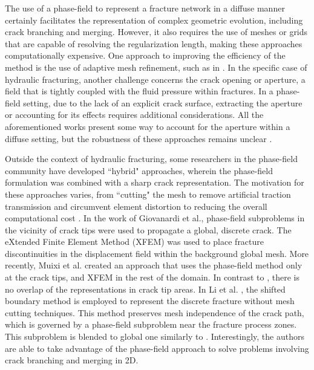     The use of a phase-field to represent a fracture network in a diffuse manner certainly facilitates the representation of complex geometric evolution, including crack branching and merging. However, it also requires the use of meshes or grids that are capable of resolving the regularization length, making these approaches computationally expensive. One approach to improving the efficiency of the method is the use of adaptive mesh refinement, such as in \cite{heister2015primal, lee2017iterative, Wick-adaptive-2020,Gupta-adaptive-2022}. In the specific case of hydraulic fracturing, another challenge concerns the crack opening or aperture, a field that is tightly coupled with the fluid pressure within fractures. In a phase-field setting, due to the lack of an explicit crack surface, extracting the aperture or accounting for its effects requires additional considerations.  All the aforementioned  works present some way to account for the aperture within a diffuse setting, but the robustness of these approaches remains unclear \cite{lecampion2018numerical}. 

    Outside the context of hydraulic fracturing, some researchers in the phase-field community have developed ``hybrid" approaches, wherein the phase-field formulation was combined with a sharp crack representation. The motivation for these approaches varies, from ``cutting" the mesh to remove artificial traction transmission and circumvent element distortion \cite{geelen2018optimization} to reducing the overall computational cost \cite{giovanardi2017hybrid, muixi2021combined,li2023blended}. In the work of Giovanardi et al.\cite{giovanardi2017hybrid}, phase-field subproblems in the vicinity of  crack tips were used to propagate a global, discrete crack. The eXtended Finite Element Method (XFEM)\cite{moes1999finite} was used to place fracture discontinuities in the displacement field within the background global mesh. More recently, Muixi et al.\cite{muixi2021combined} created an approach that uses the phase-field method only at the crack tips, and XFEM in the rest of the domain. In contrast to \cite{giovanardi2017hybrid}, there is no overlap of the representations in crack tip areas. In Li et al. \cite{li2023blended}, the shifted boundary method is employed to represent the discrete fracture without mesh cutting techniques. This method preserves mesh independence of the crack path, which is governed by a phase-field subproblem near the fracture process zones. This subproblem is blended to global one similarly to \cite{giovanardi2017hybrid}. Interestingly, the authors are able to take advantage of the phase-field approach to solve problems involving crack branching and merging in 2D.

